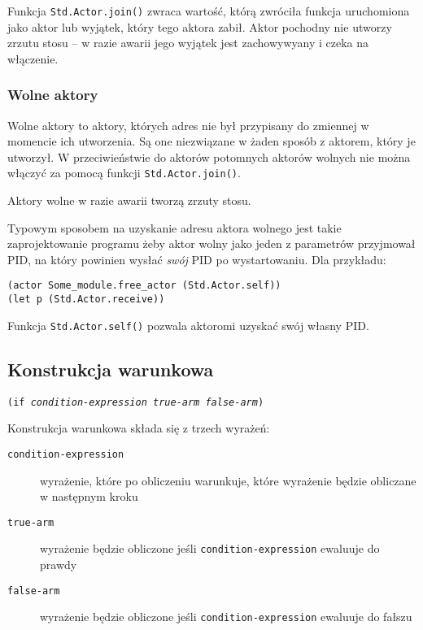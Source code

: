 Funkcja \texttt{Std.Actor.join()} zwraca wartość, którą zwróciła funkcja uruchomiona jako aktor lub wyjątek,
który tego aktora zabił. Aktor pochodny nie utworzy zrzutu stosu -- w razie awarii jego wyjątek jest
zachowywyany i czeka na włączenie.

\subsubsection{Wolne aktory}

Wolne aktory to aktory, których adres nie był przypisany do zmiennej w momencie ich utworzenia. Są one
niezwiązane w żaden sposób z aktorem, który je utworzył. W przeciwieństwie do aktorów potomnych aktorów
wolnych nie można włączyć za pomocą funkcji \texttt{Std.Actor.join()}.

Aktory wolne w razie awarii tworzą zrzuty stosu.

Typowym sposobem na uzyskanie adresu aktora wolnego jest takie zaprojektowanie programu żeby aktor wolny jako
jeden z parametrów przyjmował PID, na który powinien wysłać \emph{swój} PID po wystartowaniu. Dla przykładu:

\begin{lstlisting}
(actor Some_module.free_actor (Std.Actor.self))
(let p (Std.Actor.receive))
\end{lstlisting}

Funkcja \texttt{Std.Actor.self()} pozwala aktoromi uzyskać swój własny PID.

\subsection{Konstrukcja warunkowa}

\texttt{(if \emph{condition-expression} \emph{true-arm} \emph{false-arm})}
\newline

Konstrukcja warunkowa składa się z trzech wyrażeń:

\begin{description}
    \item[\texttt{condition-expression}] wyrażenie, które po obliczeniu warunkuje, które wyrażenie będzie
        obliczane w następnym kroku
    \item[\texttt{true-arm}] wyrażenie będzie obliczone jeśli \texttt{condition-expression} ewaluuje do prawdy
    \item[\texttt{false-arm}] wyrażenie będzie obliczone jeśli \texttt{condition-expression} ewaluuje do
        fałszu
\end{description}

